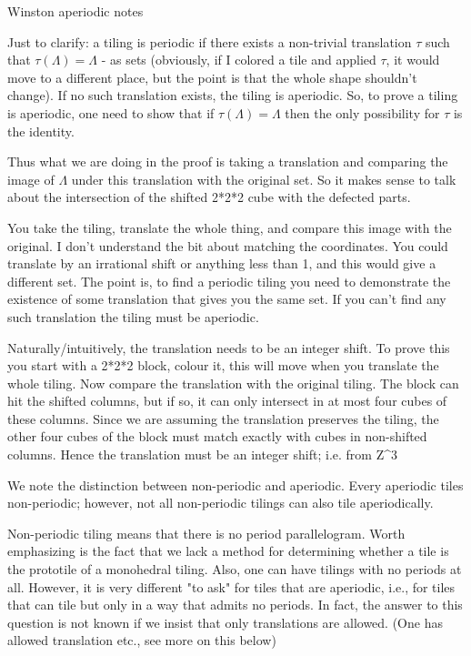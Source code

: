 
Winston aperiodic notes

Just to clarify: a tiling is periodic if there exists a non-trivial translation $\tau$ such that $\tau(\Lambda)=\Lambda$ - as sets 
(obviously, if I colored a tile and applied $\tau$, it would move to a different place, but the point is that the whole shape shouldn't change). 
If no such translation exists, the tiling is aperiodic. So, to prove a tiling is aperiodic, one need to show that if $\tau(\Lambda)=\Lambda$
then the only possibility for $\tau$ is the identity. 

Thus what we are doing in the proof is taking a translation and comparing the image of $\Lambda$ under this translation with the original set. 
So it makes sense to talk about the intersection of the shifted 2*2*2 cube with the defected parts. 

You take the tiling, translate the whole thing, and compare this image with the original. 
I don't understand the bit about matching the coordinates. You could translate by an irrational shift or anything less than 1, 
and this would give a different set. The point is, to find a periodic tiling you need to demonstrate the existence of some translation 
that gives you the same set. If you can't find any such translation the tiling must be aperiodic. 

Naturally/intuitively, the translation needs to be an integer shift.  
To prove this you start with a 2*2*2 block, colour it, this will move when you translate the whole tiling. 
Now compare the translation with the original tiling. The block can hit the shifted columns, but if so, it can only intersect in at 
most four cubes of these columns. Since we are assuming the translation preserves the tiling, the other four cubes of the block must 
match exactly with cubes in non-shifted columns. Hence the translation must be an integer shift; i.e. from Z^3    




We note the distinction between non-periodic and aperiodic. 
Every aperiodic tiles non-periodic; however, not all non-periodic tilings can also tile aperiodically. 



Non-periodic tiling means that there is no period parallelogram.  
Worth emphasizing is the fact that we lack a method for determining whether a tile is the prototile of a monohedral tiling. 
Also, one can have tilings with no periods at all. However, it is very different "to ask" for tiles that are aperiodic, i.e., 
for tiles that can tile but only in a way that admits no periods. In fact, the answer to this question is not known if we insist that only 
translations are allowed. (One has allowed translation etc., see more on this below)



